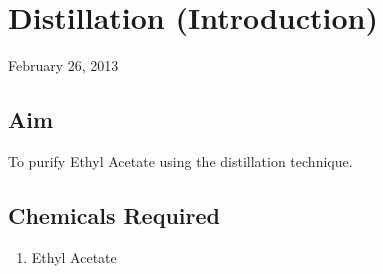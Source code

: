 \chapter{Distillation (Introduction)}
\begin{flushright}
February 26, 2013
\end{flushright}
\section{Aim}
To purify Ethyl Acetate using the distillation technique.

\section {Chemicals Required}
	\begin{enumerate}
		\item Ethyl Acetate
	\end{enumerate}


